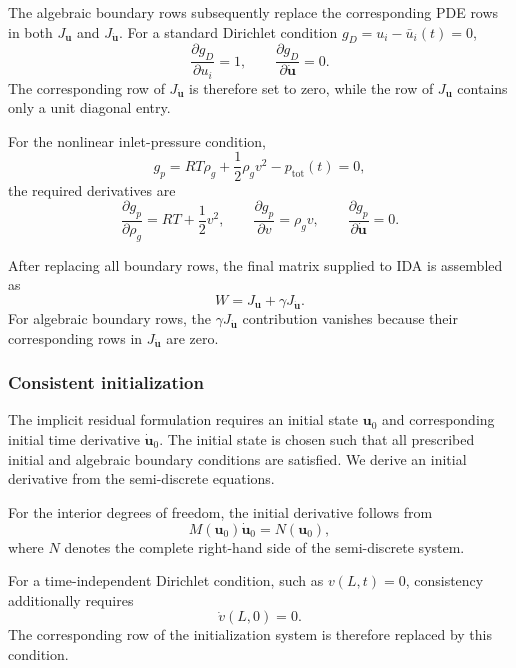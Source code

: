 The algebraic boundary rows subsequently replace the corresponding PDE rows in both $J_{\mathbf u}$ and $J_{\dot{\mathbf u}}$. For a standard Dirichlet condition $g_D=u_i-\bar u_i(t)=0$,
\begin{equation}
\frac{\partial g_D}{\partial u_i}=1,\qquad
\frac{\partial g_D}{\partial\dot{\mathbf u}}=0.
\end{equation}
The corresponding row of $J_{\dot{\mathbf u}}$ is therefore set to zero, while the row of $J_{\mathbf u}$ contains only a unit diagonal entry.

For the nonlinear inlet-pressure condition,
\begin{equation}
g_p=RT\rho_g+\frac{1}{2}\rho_gv^2-p_{\mathrm{tot}}(t)=0,
\end{equation}
the required derivatives are
\begin{equation}\label{eq:model4_pressure_jacobian}
\frac{\partial g_p}{\partial\rho_g}
=RT+\frac{1}{2}v^2,\qquad
\frac{\partial g_p}{\partial v}
=\rho_gv,\qquad
\frac{\partial g_p}{\partial\dot{\mathbf u}}=0.
\end{equation}

After replacing all boundary rows, the final matrix supplied to IDA is assembled as
\begin{equation}
W=J_{\mathbf u}+\gamma J_{\dot{\mathbf u}}.
\end{equation}
For algebraic boundary rows, the $\gamma J_{\dot{\mathbf u}}$ contribution vanishes because their corresponding rows in $J_{\dot{\mathbf u}}$ are zero.

\subsubsection{Consistent initialization}

The implicit residual formulation requires an initial state $\mathbf u_0$ and corresponding initial time derivative $\dot{\mathbf u}_0$. The initial state is chosen such that all prescribed initial and algebraic boundary conditions are satisfied. We derive an initial derivative from the semi-discrete equations.

For the interior degrees of freedom, the initial derivative follows from
\begin{equation}
M(\mathbf u_0)\dot{\mathbf u}_0=N(\mathbf u_0),
\end{equation}
where $N$ denotes the complete right-hand side of the semi-discrete system.

For a time-independent Dirichlet condition, such as $v(L,t)=0$, consistency additionally requires
\begin{equation}
\dot v(L,0)=0.
\end{equation}
The corresponding row of the initialization system is therefore replaced by this condition.

